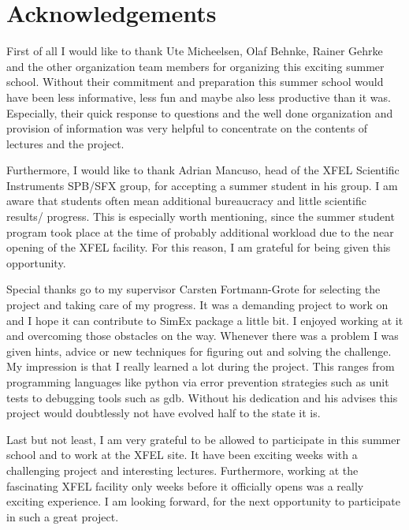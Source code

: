 \documentclass[12pt,paper=a4,twoside,titlepage,abstracton,bibliography=totoc,ngerman,english]{scrartcl}
\begin{document}




\section{Acknowledgements}
First of all I would like to thank Ute Micheelsen, Olaf Behnke, Rainer Gehrke and the other organization team members for organizing this exciting summer school. Without their commitment and preparation this summer school would have been less informative, less fun and maybe also less productive than it was. Especially, their quick response to questions and the well done organization and provision of information was very helpful to concentrate on the contents of lectures and the project.

Furthermore, I would like to thank Adrian Mancuso, head of the XFEL Scientific Instruments SPB/SFX group, for accepting a summer student in his group. I am aware that students often mean additional bureaucracy and little scientific results/ progress. This is especially worth mentioning, since the summer student program took place at the time of probably additional workload due to the near opening of the XFEL facility. For this reason, I am grateful for being given this opportunity.

Special thanks go to my supervisor Carsten Fortmann-Grote for selecting the project and taking care of my progress. It was a demanding project to work on and I hope it can contribute to SimEx package a little bit. I enjoyed working at it and overcoming those obstacles on the way. Whenever there was a problem I was given hints, advice or new techniques for figuring out and solving the challenge. My impression is that I really learned a lot during the project. This ranges from programming languages like python via error prevention strategies such as unit tests to debugging tools such as gdb. Without his dedication and his advises this project would doubtlessly not have evolved half to the state it is.

Last but not least, I am very grateful to be allowed to participate in this summer school and to work at the XFEL site. It have been exciting weeks with a challenging project and interesting lectures. Furthermore, working at the fascinating XFEL facility only weeks before it officially opens was a really exciting experience. I am looking forward, for the next opportunity to participate in such a great project.

\clearpage
\appendix


\appendix
\clearpage


%
\end{document}
